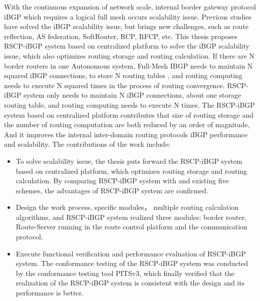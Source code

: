 \begin{eabstract}
   With the continuous expansion of network scale, internal border gateway protocol iBGP which requires a logical full mesh occurs scalability issue. Previous studies have solved the iBGP scalability issue, but brings new challenges, such as route reflection, AS federation, SoftRouter, RCP, RFCP, etc. This thesis proposes RSCP-iBGP system based on centralized platform to solve the iBGP scalability issue, which also optimizes routing storage and routing calculation. If there are N border routers in one Autonomous system, Full-Mesh IBGP needs to maintain N squared iBGP connections, to store N routing tables , and routing computing needs to execute N squared times in the process of routing convergence. RSCP-iBGP system only needs to maintain N iBGP connections, about one storage routing table, and routing computing needs to execute N times. The RSCP-iBGP system based on centralized platform contributes that size of routing storage and the number of routing computation are both reduced by an order of magnitude, And it improves the internal inter-domain routing protocols iBGP performance and scalability. The contributions of the work include:

   \begin{itemize}
    \item To solve scalability issue, the thesis puts forward the RSCP-iBGP system based on centralized platform, which optimizes routing storage and routing calculation. By comparing RSCP-iBGP system with and existing five schemes, the advantages of RSCP-iBGP system are confirmed. 
    \item Design the work process, specific modules， multiple routing calculation algorithms, and RSCP-iBGP system realized three modules: border router, Route-Server running in the route control platform and the communication protocol.
    \item Execute functional verification and performance evaluation of RSCP-iBGP system. The conformance testing of the RSCP-iBGP system was conducted by the conformance testing tool PITSv3, which finally verified that the realization of the RSCP-iBGP system is consistent with the design and its performance is better.
  \end{itemize}
\end{eabstract}





